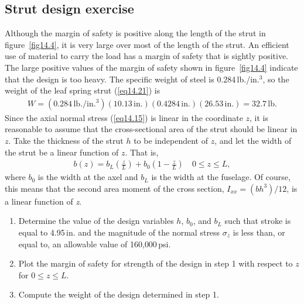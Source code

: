\documentclass{AeroStructure-ERJohnson}
\begin{document}
\pagebreak

{\def\thefigure{14.4}
}


\subsection{Strut design exercise}\label{sec14.1.2}

Although the margin of safety is positive along the length of the strut in figure~\ref{fig14.4}, it is very large over most of the length of the strut. An efficient use of material to carry the load has a margin of safety that is sightly positive. The large positive values of the margin of safety shown in figure~\ref{fig14.4} indicate that the design is too heavy. The specific weight of steel is 0.284\,lb./in.$^3$, so the weight of the leaf spring strut (\ref{eq14.21}) is
\begin{align}\label{eq14.22}
W=(0.284\,\mathrm{lb}./\text{in.}^{3})(10.13\,\text{in.})(0.4284\,\text{in.})(26.53\,\text{in.})=32.7\,\mathrm{lb}.
\end{align}
Since the axial normal stress (\ref{eq14.15}) is linear in the coordinate $z$, it is reasonable to assume that the cross-sectional area of the strut should be linear in $z$. Take the thickness of the strut $h$ to be independent of $z$, and let the width of the strut be a linear function of $z$. That is,
\begin{align}\label{eq14.23}
b(z)=b_{L}\left(\frac{z}{L}\right)+b_{0}\left(1-\frac{z}{L}\right) \quad 0 \leq z \leq L,
\end{align}
where $b_{0}$ is the width at the axel and $b_{L}$ is the width at the fuselage. Of course, this means that the second area moment of the cross section, $I_{x x}=\left(b h^{3}\right)/12$, is a linear function of \textit{z}.
\begin{enumerate}
  \item Determine the value of the design variables $h$, $b_{0}$, and $b_{L}$ such that stroke is equal to 4.95\,in. and the magnitude of the normal stress $\sigma_{z}$ is less than, or equal to, an allowable value of 160{,}000\,psi.
  \item Plot the margin of safety for strength of the design in step 1 with respect to $z$ for $0 \leq z \leq L$.
  \item Compute the weight of the design determined in step 1.
\end{enumerate}
\end{document}
